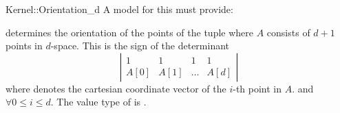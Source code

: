 \begin{ccRefFunctionObjectConcept}{Kernel::Orientation_d}
A model for this must provide:


{determines the orientation of the points of the tuple
 \ccc{A = tuple [first,last)} where $A$ consists of $d + 1$ points in
 $d$-space. This is the sign of the determinant
  \[ \left| \begin{array}{cccc}
  1 & 1 & 1 & 1 \\
  A[0] & A[1] & \dots & A[d]
  \end{array}  \right|  \]
  where  denotes the cartesian coordinate vector of
  the $i$-th point in $A$.
  \ccPrecond \ccc{size [first,last) == d+1} and
   $\forall 0 \leq i \leq d$.
  \ccRequire The value type of  is
  .  }

\end{ccRefFunctionObjectConcept}
